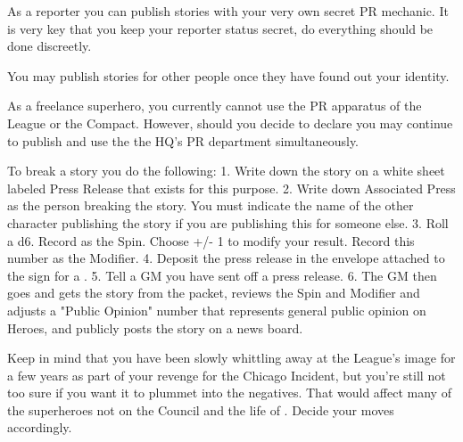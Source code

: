 \documentclass[green]{LRSguildcamp1}
\begin{document}
\name{\gNewspaperPR{}}

As a reporter you can publish stories with your very own secret PR mechanic. It is very key that you keep your reporter status secret, do everything should be done discreetly. 

You may publish stories for other people once they have found out your identity. 

As a freelance superhero, you currently cannot use the PR apparatus of the League or the Compact. However, should you decide to declare you may continue to publish and use the the HQ's PR department simultaneously.  

To break a story you do the following:
1. Write down the story on a white sheet labeled Press Release that exists for this purpose. 
2. Write down Associated Press as the person breaking the story. You must indicate the name of the other character publishing the story if you are publishing this for someone else. 
3. Roll a d6. Record as the Spin. Choose +/- 1 to modify your result. Record this number as the Modifier. 
4. Deposit the press release in the envelope attached to the sign for a \sWallPhone{}. 
5. Tell a GM you have sent off a press release.
6. The GM then goes and gets the story from the packet, reviews the Spin and Modifier and adjusts a "Public Opinion" number that represents general public opinion on Heroes, and publicly posts the story on a news board. 

Keep in mind that you have been slowly whittling away at the League's image for a few years as part of your revenge for the Chicago Incident, but you're still not too sure if you want it to plummet into the negatives. That would affect many of the superheroes not on the Council and the life of \cYoungest{}.  Decide your moves accordingly.
\end{document}
